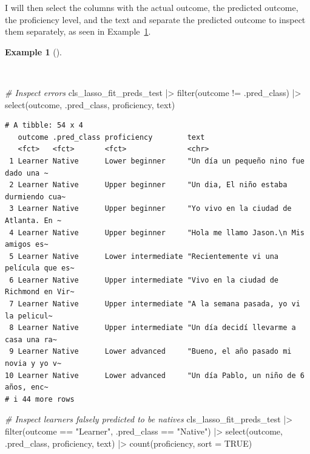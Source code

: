 \documentclass[
  letterpaper,
]{book}
\newenvironment{Shaded}{\begin{snugshade}}{\end{snugshade}}
\newcommand{\AttributeTok}[1]{\textcolor[rgb]{0.00,0.00,0.00}{#1}}
\newcommand{\CommentTok}[1]{\textcolor[rgb]{0.00,0.00,0.00}{\textit{#1}}}
\newcommand{\ConstantTok}[1]{\textcolor[rgb]{0.00,0.00,0.00}{#1}}
\newcommand{\FunctionTok}[1]{\textcolor[rgb]{0.00,0.00,0.00}{#1}}
\newcommand{\NormalTok}[1]{\textcolor[rgb]{0.00,0.00,0.00}{#1}}
\newcommand{\SpecialCharTok}[1]{\textcolor[rgb]{0.00,0.00,0.00}{#1}}
\newcommand{\StringTok}[1]{\textcolor[rgb]{0.00,0.00,0.00}{#1}}
\theoremstyle{definition}
\newtheorem{example}{Example}[chapter]
\theoremstyle{remark}
\begin{document}
I will then select the columns with the actual outcome, the predicted
outcome, the proficiency level, and the text and separate the predicted
outcome to inspect them separately, as seen in
Example~\ref{exm-predict-class-tune-hyperparameters-evaluate-test-errors}.

\begin{example}[]\protect\hypertarget{exm-predict-class-tune-hyperparameters-evaluate-test-errors}{}\label{exm-predict-class-tune-hyperparameters-evaluate-test-errors}

~

\begin{Shaded}
\begin{Highlighting}[]
\CommentTok{\# Inspect errors}
\NormalTok{cls\_lasso\_fit\_preds\_test }\SpecialCharTok{|\textgreater{}}
  \FunctionTok{filter}\NormalTok{(outcome }\SpecialCharTok{!=}\NormalTok{ .pred\_class) }\SpecialCharTok{|\textgreater{}}
  \FunctionTok{select}\NormalTok{(outcome, .pred\_class, proficiency, text)}
\end{Highlighting}
\end{Shaded}

\begin{verbatim}
# A tibble: 54 x 4
   outcome .pred_class proficiency        text                                  
   <fct>   <fct>       <fct>              <chr>                                 
 1 Learner Native      Lower beginner     "Un día un pequeño nino fue dado una ~
 2 Learner Native      Upper beginner     "Un dia, El niño estaba durmiendo cua~
 3 Learner Native      Upper beginner     "Yo vivo en la ciudad de Atlanta. En ~
 4 Learner Native      Upper beginner     "Hola me llamo Jason.\n Mis amigos es~
 5 Learner Native      Lower intermediate "Recientemente vi una película que es~
 6 Learner Native      Upper intermediate "Vivo en la ciudad de Richmond en Vir~
 7 Learner Native      Upper intermediate "A la semana pasada, yo vi la pelicul~
 8 Learner Native      Upper intermediate "Un día decidí llevarme a casa una ra~
 9 Learner Native      Lower advanced     "Bueno, el año pasado mi novia y yo v~
10 Learner Native      Lower advanced     "Un día Pablo, un niño de 6 años, enc~
# i 44 more rows
\end{verbatim}

\begin{Shaded}
\begin{Highlighting}[]
\CommentTok{\# Inspect learners falsely predicted to be natives}
\NormalTok{cls\_lasso\_fit\_preds\_test }\SpecialCharTok{|\textgreater{}}
  \FunctionTok{filter}\NormalTok{(outcome }\SpecialCharTok{==} \StringTok{"Learner"}\NormalTok{, .pred\_class }\SpecialCharTok{==} \StringTok{"Native"}\NormalTok{) }\SpecialCharTok{|\textgreater{}}
  \FunctionTok{select}\NormalTok{(outcome, .pred\_class, proficiency, text) }\SpecialCharTok{|\textgreater{}}
  \FunctionTok{count}\NormalTok{(proficiency, }\AttributeTok{sort =} \ConstantTok{TRUE}\NormalTok{)}
\end{Highlighting}
\end{Shaded}


\end{example}
\end{document}
